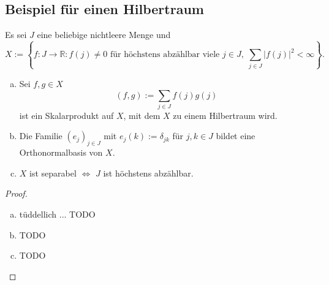 \documentclass[ngerman]{article}
\theoremstyle{definition}%
\newcommand{\R}{\mathbb{R}}
\newcommand{\abs}[1]{\left\lvert #1 \right\rvert }
\renewcommand{\{ }{\left\lbrace}
\renewcommand{\}}{\right\rbrace}
\begin{document}
\subsection{ Beispiel für einen Hilbertraum}
Es sei $J$ eine beliebige nichtleere Menge und
	$$X:=\{ f: J \to \R : f(j) \not = 0 \text{ für höchstens abzählbar viele } j\in J,\; \sum_{j\in J} \abs{f(j)} ^2 < \infty\}.$$
	\begin{enumerate}[(a)]
	\item Sei $f,g \in X$
		$$(f,g) := \sum_{j\in J} f(j)g(j) $$
		ist ein Skalarprodukt auf $X$, mit dem $X$ zu einem Hilbertraum wird.
	
	\item Die Familie $(e_j)_{j\in J}$ mit $e_j(k) := \delta_{jk} $ für $j,k\in J$ bildet eine Orthonormalbasis von $X$.
	
	\item $X$ ist separabel $\Leftrightarrow$ $J$ ist höchstens abzählbar.	
	\end{enumerate}
	
	\begin{proof}
	\begin{enumerate}[(a)]
		\item tüddellich ... TODO
		\item TODO
		\item TODO
	\end{enumerate}		
	
	\end{proof}
\end{document}
